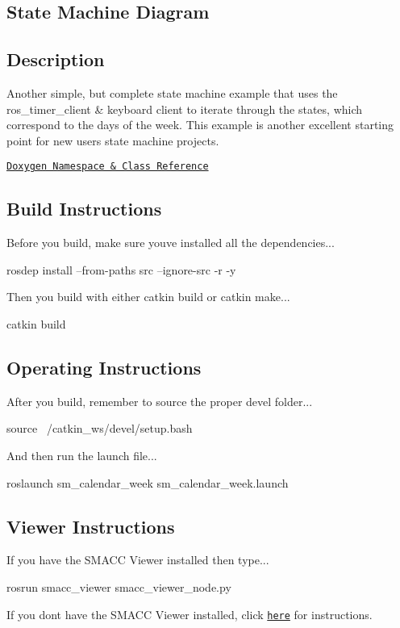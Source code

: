 \subsection*{State Machine Diagram}



\subsection*{Description}

Another simple, but complete state machine example that uses the ros\+\_\+timer\+\_\+client \& keyboard client to iterate through the states, which correspond to the days of the week. This example is another excellent starting point for new users state machine projects.~\newline


\href{https://reelrbtx.github.io/SMACC_Documentation/master/html/namespacesm__calendar__week.html}{\tt Doxygen Namespace \& Class Reference}

\subsection*{Build Instructions}

Before you build, make sure you\textquotesingle{}ve installed all the dependencies...


\begin{DoxyCode}
rosdep install --from-paths src --ignore-src -r -y 
\end{DoxyCode}


Then you build with either catkin build or catkin make...


\begin{DoxyCode}
catkin build
\end{DoxyCode}


\subsection*{Operating Instructions}

After you build, remember to source the proper devel folder...


\begin{DoxyCode}
source ~/catkin\_ws/devel/setup.bash
\end{DoxyCode}


And then run the launch file...


\begin{DoxyCode}
roslaunch sm\_calendar\_week sm\_calendar\_week.launch
\end{DoxyCode}


\subsection*{Viewer Instructions}

If you have the S\+M\+A\+CC Viewer installed then type...


\begin{DoxyCode}
rosrun smacc\_viewer smacc\_viewer\_node.py
\end{DoxyCode}


If you don\textquotesingle{}t have the S\+M\+A\+CC Viewer installed, click \href{http://smacc.ninja/smacc-viewer/}{\tt here} for instructions. 
